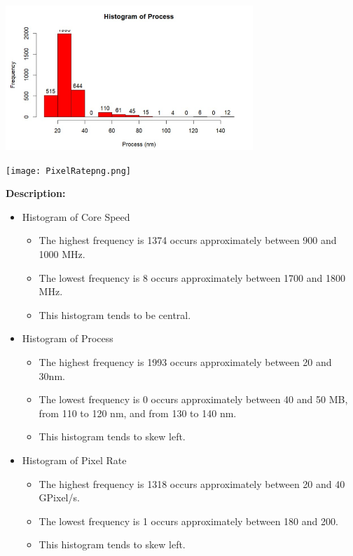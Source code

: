 \begin{center}
    \includegraphics[width=0.7\textwidth]{Process.png}
\end{center}
\begin{center}
    \texttt{[image: PixelRatepng.png]}
\end{center}

\textbf{Description:}
\begin{itemize}
    \item Histogram of Core Speed
    \begin{itemize}
        \item The highest frequency is 1374 occurs approximately between 900 and 1000 MHz.
        \item The lowest frequency is 8 occurs approximately between 1700 and 1800 MHz.
        \item This histogram tends to be central.
    \end{itemize}

    \item Histogram of Process
    \begin{itemize}
        \item The highest frequency is 1993 occurs approximately between 20 and 30nm.
        \item The lowest frequency is 0 occurs approximately between 40 and 50 MB, from 110 to 120 nm, and from 130 to 140 nm.
        \item This histogram tends to skew left.
    \end{itemize}
    \item Histogram of Pixel Rate
    \begin{itemize}
        \item The highest frequency is 1318 occurs approximately between 20 and 40 GPixel/s.
        \item The lowest frequency is 1 occurs approximately between 180 and 200.
        \item This histogram tends to skew left.
    \end{itemize}
\end{itemize}

